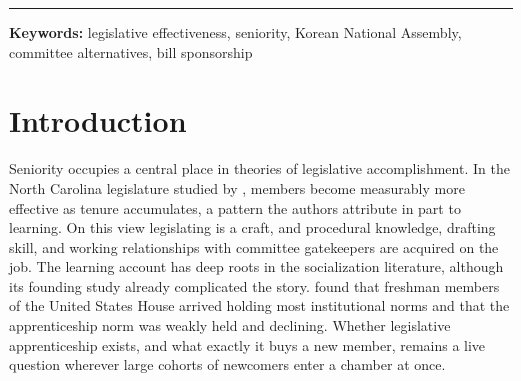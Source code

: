 \documentclass[11pt]{article}
\begin{document}
\noindent\rule{\linewidth}{0.6pt}

\begin{abstract}
\noindent Learning accounts of legislative careers predict that first-term legislators underperform at the start of a term and close the gap as experience accumulates. I test this prediction with 93,572 member law bills introduced in the 17th through 22nd Korean National Assemblies. With seniority measured at each Assembly, first-term sponsors show no deficit in direct bill passage in year one, and the gap does not change over the term. An equivalence test bounds the year-one gap within one percentage point of zero, about one sixth of the strict-passage base rate. On the committee-alternative absorption channel, first-term sponsors fall behind re-elected members as the term goes on, by about one and a half percentage points on average after year one and by about three points in year four. The average gap after year one is not distinguishable from zero at the 5 percent level, and the information criterion favors a gradual decline over a one-time step. Version 1 of this paper took first-term status from a field that records lifetime seniority at the time of data collection. For the 17th through 21st Assemblies that field marks only members who were never re-elected, and under it the absorption gap was more than twice as large and took the form of a step. The robustness and mechanism analyses of Version 1 were run only on that coding, and they are retained as a record. Tests of committee position, cosponsorship-network access and portfolio content, formulated after the absorption pattern had been observed, did not account for the Version 1 step. The contrast with the more inclusive picture of absorption reported for the United States Congress is tentative, because the two studies estimate different quantities.
\end{abstract}

\bigskip
\noindent\textbf{Keywords:} legislative effectiveness, seniority, Korean National Assembly, committee alternatives, bill sponsorship

\bigskip
\setcounter{page}{0}
\clearpage

\section{Introduction}

Seniority occupies a central place in theories of legislative accomplishment. In the North Carolina legislature studied by \citet{padroimiquel2006}, members become measurably more effective as tenure accumulates, a pattern the authors attribute in part to learning. On this view legislating is a craft, and procedural knowledge, drafting skill, and working relationships with committee gatekeepers are acquired on the job. The learning account has deep roots in the socialization literature, although its founding study already complicated the story. \citet{asher1973} found that freshman members of the United States House arrived holding most institutional norms and that the apprenticeship norm was weakly held and declining. Whether legislative apprenticeship exists, and what exactly it buys a new member, remains a live question wherever large cohorts of newcomers enter a chamber at once.
\end{document}
